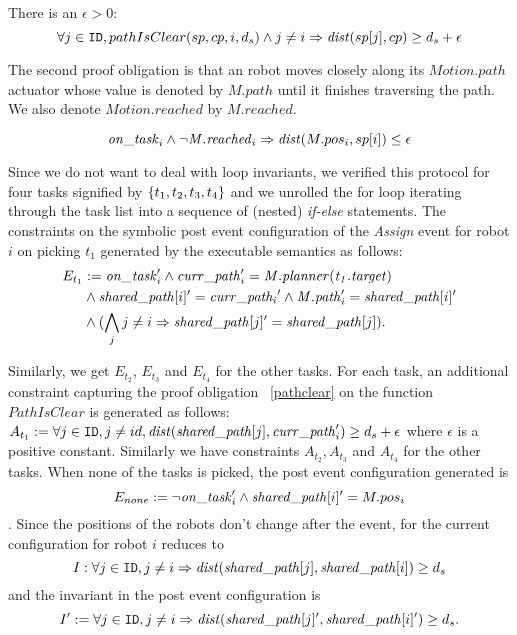 \begin{proofob}
    \label{pathclear} There is an $\epsilon > 0$:
    $$\forall j \in \texttt{ID}, pathIsClear(sp, cp,  i, d_s) \wedge j \neq i \Rightarrow  \mathit{dist}(sp[j], cp) \geq d_s + \epsilon$$
\end{proofob}


The second proof obligation is that an robot moves closely along its $\mathit{Motion.path}$ actuator whose value is denoted by $\mathit{M.path}$ until it finishes traversing the path. We also denote $\mathit{Motion.reached}$ by $\mathit{M.reached}$.
\begin{proofob}
        \label{stlinemotion}
    $$\mathit{on\_task}_i\wedge \neg \mathit{M.reached}_i \Rightarrow \mathit{dist}(M.pos_i, sp[i]) \leq \epsilon $$
\end{proofob}

Since we do not want to deal with loop invariants, we verified this protocol for four tasks signified by $\left\{t_1,t_2,t_3,t_4\right\}$ and we unrolled the for loop iterating through the task list into a sequence of (nested) \emph{if-else} statements. The constraints on the symbolic post event configuration of the \emph{Assign} event for robot $i$ on picking $t_1$ generated by the \K executable semantics as follows: \begin{align*}E_{t_1} &:= \mathit{on\_task}_i' \wedge \mathit{curr\_path}_i' = \mathit{M.planner(t_1.target)} \\ &\wedge \mathit{shared\_path}[i]' = \mathit{curr\_path_i}' \wedge \mathit{M.path}_i' = \mathit{shared\_path}[i]' \\
  &\wedge (\bigwedge_j j\neq i \Rightarrow \mathit{shared\_path}[j]'= \mathit{shared\_path}[j]).
 \end{align*}

Similarly, we get $E_{t_2}$, $E_{t_3}$ and $E_{t_4}$ for the other tasks. For each task, an additional constraint capturing the proof obligation ~\ref{pathclear} on the function $\mathit{PathIsClear}$ is generated as follows:  $A_{t_1} := \forall j \in \texttt{ID}, j \neq id, \mathit{dist}(\mathit{shared\_path}[j], \mathit{curr\_path}_i') \geq d_s + \epsilon$ where $\epsilon$ is a positive constant. Similarly we have constraints $A_{t_2}, A_{t_3}$  and $A_{t_4}$ for the other tasks. When none of the tasks is picked, the post event configuration generated is $$ E_{none} :=\neg\mathit{on\_task}_i' \wedge \mathit{shared\_path}[i]' = M.pos_i $$. Since the positions of the robots don't change after the event,  for the current configuration for robot $i$ reduces to $$I: \forall j \in \texttt{ID}, j \neq i \Rightarrow \mathit{dist}(\mathit{shared\_path}[j], \mathit{shared\_path}[i]) \geq d_s  $$ and the invariant in the post event configuration is $$I' := \forall j \in \texttt{ID}, j \neq i \Rightarrow \mathit{dist}(\mathit{shared\_path}[j]', \mathit{shared\_path}[i]') \geq d_s  .$$

